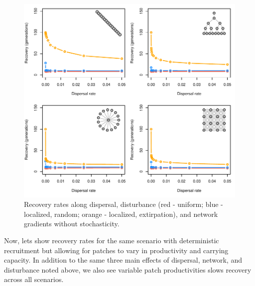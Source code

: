 \documentclass[]{article}
\begin{document}
\begin{figure}[H]

{\centering \includegraphics{Managing_for_ecological_surprises_in_metapopulations_makeHTML_files/figure-latex/general results-1} 

}

\caption{Recovery rates along dispersal, disturbance (red - uniform; blue - localized, random; orange - localized, extirpation), and network gradients without stochasticity.}\label{fig:general results}
\end{figure}
\newpage

Now, lets show recovery rates for the same scenario with deterministic
recruitment but allowing for patches to vary in productivity and
carrying capacity. In addition to the same three main effects of
dispersal, network, and disturbance noted above, we also see variable
patch productivities slows recovery across all scenarios.
\end{document}
